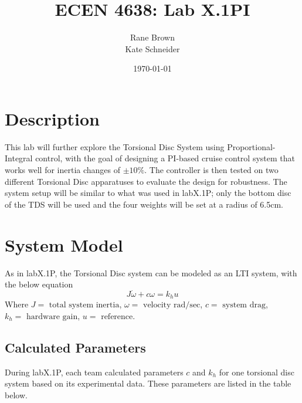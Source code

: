 \documentclass[11pt,titlepage]{article}
\author{Rane Brown \\ Kate Schneider}
\title{ECEN 4638: Lab X.1PI}
\date{\today}
\begin{document}
\maketitle
\tableofcontents
\vspace{-1em}
\listoffigures
\newpage

\section{Description}
    This lab will further explore the Torsional Disc System using Proportional-Integral control, with the goal of designing a PI-based cruise control system that works well for inertia changes of $\pm10\%$. The controller is then tested on two different Torsional Disc apparatuses to evaluate the design for robustness. The system setup will be similar to what was used in labX.1P; only the bottom disc of the TDS will be used and the four weights will be set at a radius of 6.5cm.


\section{System Model}
   As in labX.1P, the Torsional Disc system can be modeled as an LTI system, with the below equation
    \begin{equation} \label{eq:lti}
        J\dot{\omega}+c\omega=k_hu
    \end{equation}
    Where $J=\mbox{ total system inertia}$, $\omega=\mbox{ velocity rad/sec}$, $c=\mbox{ system drag}$, $k_h=\mbox{ hardware gain}$, $u=\mbox{ reference}$.
    
    
    \subsection{Calculated Parameters}
        During labX.1P, each team calculated parameters $c$ and $k_h$ for one torsional disc system based on its experimental data. These parameters are listed in the table below.
\end{document}
